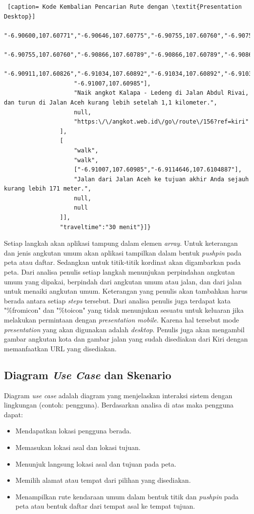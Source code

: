 \begin{lstlisting} [caption= Kode Kembalian Pencarian Rute dengan \textit{Presentation Desktop}]
					"-6.90600,107.60771","-6.90646,107.60775","-6.90755,107.60760","-6.90755,107.60760",
					"-6.90755,107.60760","-6.90866,107.60789","-6.90866,107.60789","-6.90866,107.60789",
					"-6.90911,107.60826","-6.91034,107.60892","-6.91034,107.60892","-6.91034,107.60892",
					"-6.91007,107.60985"],
					"Naik angkot Kalapa - Ledeng di Jalan Abdul Rivai, dan turun di Jalan Aceh kurang lebih setelah 1,1 kilometer.",
					null,
					"https:\/\/angkot.web.id\/go\/route\/156?ref=kiri"
				],
				[
					"walk",
					"walk",
					["-6.91007,107.60985","-6.9114646,107.6104887"],
					"Jalan dari Jalan Aceh ke tujuan akhir Anda sejauh kurang lebih 171 meter.",
					null,
					null
				]],
				"traveltime":"30 menit"}]}
\end{lstlisting}

Setiap langkah akan aplikasi tampung dalam elemen \textit{array}. Untuk keterangan dan jenis angkutan umum akan aplikasi tampilkan dalam bentuk \textit{pushpin} pada peta atau daftar. Sedangkan untuk titik-titik kordinat akan digambarkan pada peta. Dari analisa penulis setiap langkah menunjukan perpindahan angkutan umum yang dipakai, berpindah dari angkutan umum atau jalan, dan dari jalan untuk menaiki angkutan umum. Keterangan yang penulis akan tambahkan harus berada antara setiap \textit{steps} tersebut. Dari analisa penulis juga terdapat kata "\%fromicon" dan "\%toicon" yang tidak menunjukan sesuatu untuk keluaran jika melakukan permintaan dengan \textit{presentation mobile}. Karena hal tersebut mode \textit{presentation} yang akan digunakan adalah \textit{desktop}. Penulis juga akan mengambil gambar angkutan kota dan gambar jalan yang sudah disediakan dari Kiri dengan memanfaatkan URL yang disediakan. 

\subsection{Diagram \textit{Use Case} dan Skenario}
\label{lab:Diagram Use-Case dan Scenario}
\hspace{0.5cm} Diagram \textit{use case} adalah diagram yang menjelaskan interaksi sistem dengan lingkungan (contoh: pengguna). Berdasarkan analisa di atas maka pengguna dapat:
\begin{itemize}
	\item Mendapatkan lokasi pengguna berada.
	\item Memasukan lokasi asal dan lokasi tujuan.
	\item Menunjuk langsung lokasi asal dan tujuan pada peta.
	\item Memilih alamat atau tempat dari pilihan yang disediakan.
	\item Menampilkan rute kendaraan umum dalam bentuk titik dan \textit{pushpin} pada peta atau bentuk daftar dari tempat asal ke tempat tujuan.
\end{itemize}

